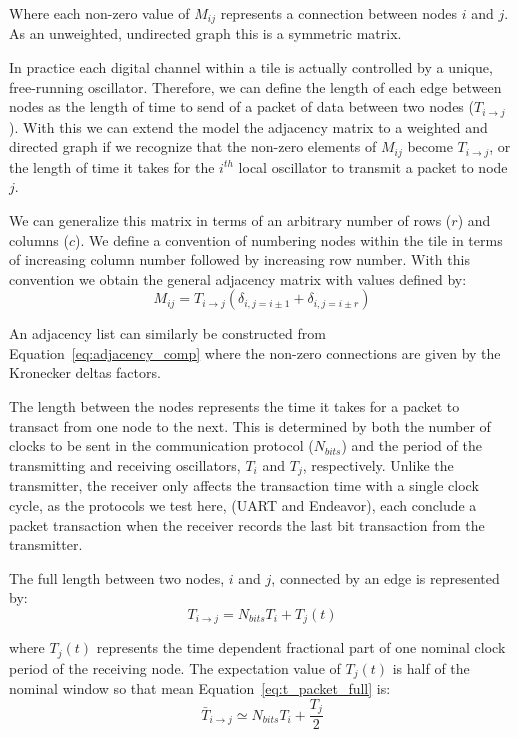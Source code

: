 Where each non-zero value of $M_{ij}$ represents a connection between nodes $i$ and $j$.
As an unweighted, undirected graph this is a symmetric matrix.

In practice each digital channel within a tile is actually controlled by a unique, free-running oscillator.
Therefore, we can define the length of each edge between nodes as the length of time to send of a packet of data between two nodes ($T_{i\rightarrow j}$).
With this we can extend the model the adjacency matrix to a weighted and directed graph if we recognize that the non-zero elements of $M_{ij}$ become $T_{i\rightarrow j}$, or the length of time it takes for the $i^{th}$ local oscillator to transmit a packet to node $j$.

We can generalize this matrix in terms of an arbitrary number of rows ($r$) and columns ($c$).
We define a convention of numbering nodes within the tile in terms of increasing column number followed by increasing row number.
With this convention we obtain the general adjacency matrix with values defined by:
\begin{equation}~\label{eq:adjacency_comp}
  M_{ij} = T_{i\rightarrow j}(\delta_{i,j=i\pm 1} + \delta_{i,j=i\pm r})
\end{equation}

An adjacency list can similarly be constructed from Equation~\ref{eq:adjacency_comp} where the non-zero connections are given by the Kronecker deltas factors.

The length between the nodes represents the time it takes for a packet to transact from one node to the next.
This is determined by both the number of clocks to be sent in the communication protocol ($N_{bits}$) and the period of the transmitting and receiving oscillators, $T_{i}$ and $T_{j}$, respectively.
Unlike the transmitter, the receiver only affects the transaction time with a single clock cycle, as the protocols we test here, (UART and Endeavor), each conclude a packet transaction when the receiver records the last bit transaction from the transmitter.

The full length between two nodes, $i$ and $j$, connected by an edge is represented by:
\begin{equation}~\label{eq:t_packet_full}
T_{i\rightarrow j} = N_{bits}T_{i} + T_{j}(t)
\end{equation}

where $T_{j}(t)$ represents the time dependent fractional part of one nominal clock period of the receiving node.
The expectation value of $T_{j}(t)$ is half of the nominal window so that mean Equation~\ref{eq:t_packet_full} is:
\begin{equation}~\label{eq:t_packet_avg}
\bar{T}_{i\rightarrow j} \simeq N_{bits}T_{i} + \frac{T_{j}}{2}
\end{equation}

